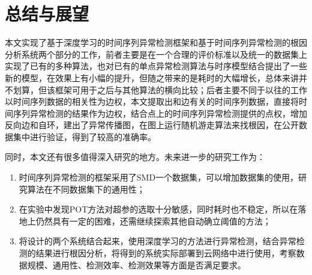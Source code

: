 
\chapter{总结与展望}
\label{cha:summary}
本文实现了基于深度学习的时间序列异常检测框架和基于时间序列异常检测的根因分析系统两个部分的工作，前者主要是在一个合理的评价标准以及统一的数据集上实现了已有的多种算法，也对已有的单点异常检测算法与时序模型结合提出了一些新的模型，在效果上有小幅的提升，但随之带来的是耗时的大幅增长，总体来讲并不划算，但该框架可用于之后与其他算法的横向比较；后者主要不同于以往的工作以时间序列数据的相关性为边权，本文提取出和边有关的时间序列数据，直接将时间序列异常检测的结果作为边权，结合点上的时间序列异常检测提供的点权，增加反向边和自环，建出了异常传播图，在图上运行随机游走算法来找根因，在公开数据集中进行验证，得到了较高的准确率。

同时，本文还有很多值得深入研究的地方。未来进一步的研究工作为：
\begin{enumerate}
    \item 时间序列异常检测的框架采用了SMD一个数据集，可以增加数据集的使用，研究算法在不同数据集下的通用性；
    \item 在实验中发现POT方法对超参的选取十分敏感，同时耗时也不稳定，所以在落地上仍然具有一定的困难，还需继续探索其他自动确立阈值的方法；
    \item 将设计的两个系统结合起来，使用深度学习的方法进行异常检测，结合异常检测的结果进行根因分析，将得到的系统实际部署到云网络中进行使用，考察数据规模、通用性、检测效率、检测效果等方面是否满足要求。
\end{enumerate}
